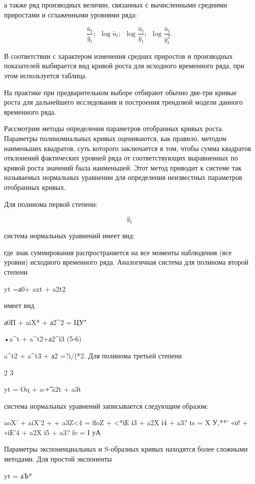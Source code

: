 а также ряд производных величин, связанных с вычисленными средними приростами и сглаженными уровнями ряда:

\[ \frac{\bar{u}_t}{\bar{y}_t};\ \ \log \bar{u}_t;\ \ \log \dfrac{\bar{u}_t}{\bar{y}_t};\ \ \log \dfrac{\bar{u}_t}{\bar{y}_t^2}. \]

В соответствии с характером изменения средних приростов и производных показателей выбирается вид кривой роста для исходного временного ряда, при этом используется таблица.





На практике при предварительном выборе отбирают обычно две-три кривые роста для дальнейшего исследования и построения трендовой модели данного временного ряда.

Рассмотрим методы определения параметров отобранных кривых роста. Параметры полиномиальных кривых оцениваются, как правило, методом наименьших квадратов, суть которого заключается в том, чтобы сумма квадратов отклонений фактических уровней ряда от соответствующих выравненных по кривой роста значений была наименьшей. Этот метод приводит к системе так называемых нормальных уравнении для определения неизвестных параметров отобранных кривых.

Для полинома первой степени:

\[ \hat{y}_t \]

система нормальных уравнений имеет вид:



где знак суммирования распространяется на все моменты наблюдения (все уровни) исходного временного ряда. Аналогичная система для полинома второй степени

yt =а0+ axt + a2t2

имеет вид

а0П + aiX* + а2^2 = ЦУ"

•a^t + a^t2+а2^і3	(5-6)

a^t2 + a^t3 + а2 =?i/(*2. Для полинома третьей степени

2	3

yt = Oq + a-\t + a2t + a3t

система нормальных уравнений записывается следующим образом:

aoX' + aiX'2 + + a3Z<4 = floZ + <*іЕ і3 + a2X і4 + a3? ts = X У,**' «о! + «іЕ'4 + a2X і5 + a3? fe = І уА

Параметры экспоненциальных и S-образных кривых находятся более сложными методами. Для простой экспоненты

yt = аЪ*


